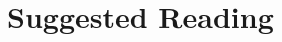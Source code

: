 \documentclass[twocolumn]{dndbook}
\begin{document}




\chapter*{Suggested Reading}


\cite{Fishel2023} %


\printbibliography[heading=none]
\end{document}
